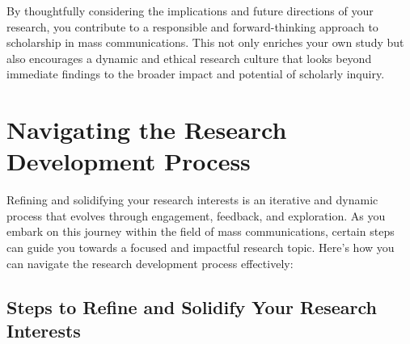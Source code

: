 \documentclass[
]{book}
\begin{document}
By thoughtfully considering the implications and future directions of your research, you contribute to a responsible and forward-thinking approach to scholarship in mass communications. This not only enriches your own study but also encourages a dynamic and ethical research culture that looks beyond immediate findings to the broader impact and potential of scholarly inquiry.

\hypertarget{navigating-the-research-development-process}{%
\section{Navigating the Research Development Process}\label{navigating-the-research-development-process}}

Refining and solidifying your research interests is an iterative and dynamic process that evolves through engagement, feedback, and exploration. As you embark on this journey within the field of mass communications, certain steps can guide you towards a focused and impactful research topic. Here's how you can navigate the research development process effectively:

\hypertarget{steps-to-refine-and-solidify-your-research-interests}{%
\subsection*{Steps to Refine and Solidify Your Research Interests}\label{steps-to-refine-and-solidify-your-research-interests}}
\end{document}
